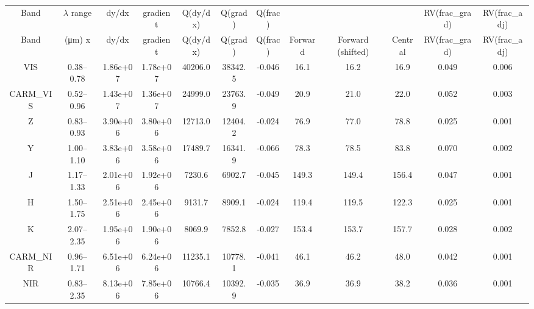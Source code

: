 \begin{table}
\begin{tabular}{cccccccccccc}
	\toprule
	Band  &   $\lambda$ range    &  dy/dx  & gradient & Q(dy/dx) & Q(grad)  & Q(frac) &    \multicolumn{3}{c}{}RV}    & RV(frac\_grad) & RV(frac\_adj)\\
Band & (\si{\micro\meter}) x & dy/dx & gradient & Q(dy/dx) & Q(grad) & Q(frac) & Forward & Forward (shifted) & Central & RV(frac\_grad) & RV(frac\_adj)\\
\midrule
VIS & 0.38--0.78 & 1.86e+07 & 1.78e+07 & 40206.0 & 38342.5 & -0.046 & 16.1 & 16.2 & 16.9 & 0.049 & 0.006\\
CARM\_VIS & 0.52--  0.96 & 1.43e+07 & 1.36e+07 & 24999.0 & 23763.9 & -0.049 & 20.9 & 21.0 & 22.0 & 0.052 & 0.003\\
Z & 0.83--0.93 & 3.90e+06 & 3.80e+06 & 12713.0 & 12404.2 & -0.024 & 76.9 & 77.0 & 78.8 & 0.025 & 0.001\\
Y & 1.00--1.10 & 3.83e+06 & 3.58e+06 & 17489.7 & 16341.9 & -0.066 & 78.3 & 78.5 & 83.8 & 0.070 & 0.002\\
J & 1.17--1.33 & 2.01e+06 & 1.92e+06 & 7230.6 & 6902.7 & -0.045 & 149.3 & 149.4 & 156.4 & 0.047 & 0.001\\
H & 1.50--1.75 & 2.51e+06 & 2.45e+06 & 9131.7 & 8909.1 & -0.024 & 119.4 & 119.5 & 122.3 & 0.025 & 0.001\\
K & 2.07--2.35 & 1.95e+06 & 1.90e+06 & 8069.9 & 7852.8 & -0.027 & 153.4 & 153.7 & 157.7 & 0.028 & 0.002\\
CARM\_NIR & 0.96--1.71 & 6.51e+06 & 6.24e+06 & 11235.1 & 10778.1 & -0.041 & 46.1 & 46.2 & 48.0 & 0.042 & 0.001\\
NIR & 0.83--2.35 & 8.13e+06 & 7.85e+06 & 10766.4 & 10392.9 & -0.035 & 36.9 & 36.9 & 38.2 & 0.036 & 0.001\\
\bottomrule
\end{tabular}


\end{table}

